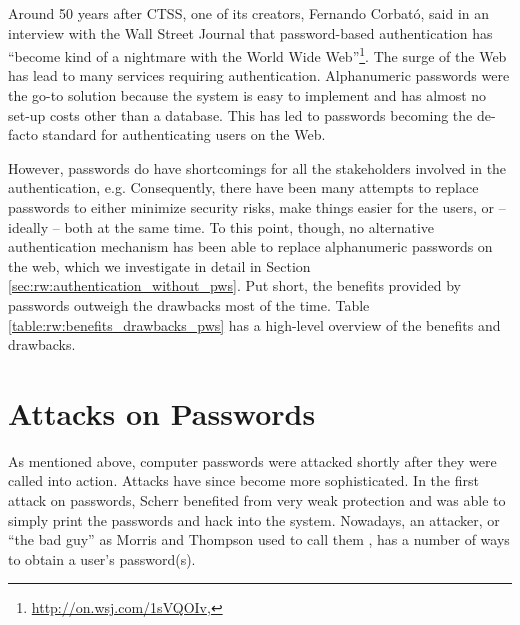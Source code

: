 


Around 50 years after CTSS, one of its creators, Fernando Corbató, said in an interview with the Wall Street Journal that password-based authentication has ``become kind of a nightmare with the World Wide Web''\footnote{\label{foot:corbato_regrets}\url{http://on.wsj.com/1sVQOIv}, }. The surge of the Web has lead to many services requiring authentication. Alphanumeric passwords were the go-to solution because the system is easy to implement and has almost no set-up costs other than a database. This has led to passwords becoming the de-facto standard for authenticating users on the Web.

However, passwords do have shortcomings for all the stakeholders involved in the authentication, e.g. Consequently, there have been many attempts to replace passwords to either minimize security risks, make things easier for the users, or -- ideally -- both at the same time. To this point, though, no alternative authentication mechanism has been able to replace alphanumeric passwords on the web, which we investigate in detail in Section \ref{sec:rw:authentication_without_pws}. Put short, the benefits provided by passwords outweigh the drawbacks most of the time. Table \ref{table:rw:benefits_drawbacks_pws} has a high-level overview of the benefits and drawbacks.




\section{Attacks on Passwords}\label{sec:rw:attack_vectors}
As mentioned above, computer passwords were attacked shortly after they were called into action. Attacks have since become more sophisticated. In the first attack on passwords, Scherr benefited from very weak protection and was able to simply print the passwords and hack into the system. Nowadays, an attacker, or ``the bad guy'' as Morris and Thompson used to call them \cite{Morris1979PasswordSecurity}, has a number of ways to obtain a user's password(s).

